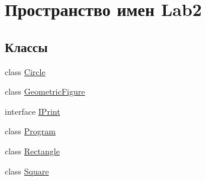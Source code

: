 \hypertarget{namespace_lab2}{}\section{Пространство имен Lab2}
\label{namespace_lab2}
\subsection*{Классы}
\begin{DoxyCompactItemize}
\item 
class \hyperlink{class_lab2_1_1_circle}{Circle}
\item 
class \hyperlink{class_lab2_1_1_geometric_figure}{Geometric\+Figure}
\item 
interface \hyperlink{interface_lab2_1_1_i_print}{I\+Print}
\item 
class \hyperlink{class_lab2_1_1_program}{Program}
\item 
class \hyperlink{class_lab2_1_1_rectangle}{Rectangle}
\item 
class \hyperlink{class_lab2_1_1_square}{Square}
\end{DoxyCompactItemize}

